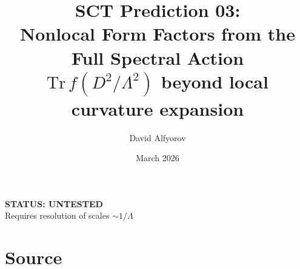 \documentclass[11pt,a4paper]{article}
\title{%
  \textbf{SCT Prediction 03:}\\[6pt]
  \Large Nonlocal Form Factors from the Full Spectral Action\\[4pt]
  \large $\mathrm{Tr}\,f(D^2/\Lambda^2)$ beyond local curvature expansion
}
\author{David Alfyorov}
\date{March 2026}
\begin{document}
\maketitle


\begin{center}
\end{center}

\begin{center}
  \colorbox{untested!15}{\parbox{0.6\textwidth}{\centering
    \textbf{\color{untested} STATUS: UNTESTED}\\[2pt]
    \small Requires resolution of scales $\sim 1/\Lambda$
  }}
\end{center}

\vspace{1em}

\section{Source}
\end{document}
